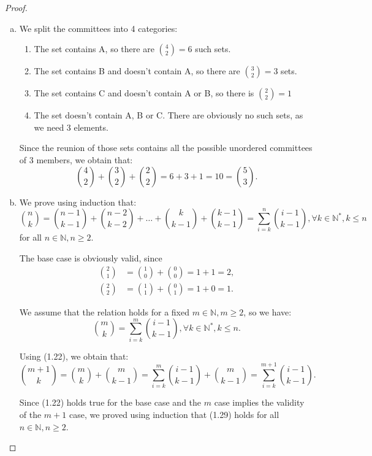     \begin{proof}
        \hfill
        \begin{enumerate}[(a)]
            \item We split the committees into 4 categories:
                \begin{enumerate}[(1)]
                    \item The set contains A, so there are $\binom{4}{2} = 6$ such sets.
                    \item The set contains B and doesn't contain A, so there are $\binom{3}{2} = 3$ sets.
                    \item The set contains C and doesn't contain A or B, so there is $\binom{2}{2} = 1$
                    \item The set doesn't contain A, B or C. There are obviously no such sets, as we
                        need 3 elements.
               \end{enumerate}

            Since the reunion of those sets contains all the possible unordered committees of 3 members,
            we obtain that:
            \[
                \binom{4}{2} + \binom{3}{2} + \binom{2}{2} = 6 + 3 + 1 = 10 = \binom{5}{3}
            .\] 
            
        \item We prove using induction that:
        \begin{equation*}\tag{1.29}
            \binom{n}{k} = \binom{n - 1}{k - 1} + \binom{n - 2}{k - 2} + \ldots + 
                            \binom{k}{k - 1} + \binom{k - 1}{k - 1}
                            = \sum_{i = k}^{n} \binom{i - 1}{k - 1}, \forall k \in \mathbb{N^*}, k \leq n
        \end{equation*}
        for all $n \in \mathbb{N}, n \geq 2$.

        The base case is obviously valid, since
        \begin{align*}
            \binom{2}{1} &= \binom{1}{0} + \binom{0}{0} = 1 + 1 = 2, \\
            \binom{2}{2} &= \binom{1}{1} + \binom{0}{1} = 1 + 0 = 1
        .\end{align*}

        We assume that the relation holds for a fixed $m \in \mathbb{N}, m \geq 2$, so we have:
        \[
            \binom{m}{k} = \sum_{i = k}^{m}\binom{i - 1}{k - 1}, \forall k \in \mathbb{N^*}, k \leq n
        .\]

        Using (1.22), we obtain that: 
        \[
            \binom{m + 1}{k} = \binom{m}{k} + \binom{m}{k - 1} 
                             = \sum_{i = k}^{m}\binom{i - 1}{k - 1} + \binom{m}{k - 1} 
                             = \sum_{i = k}^{m + 1}\binom{i - 1}{k - 1} 
        .\] 

        Since (1.22) holds true for the base case and the $m$ case implies the validity of the $m + 1$ case,
        we proved using induction that (1.29) holds for all $n \in \mathbb{N}, n \geq 2$.
    \end{enumerate}
    \end{proof}
